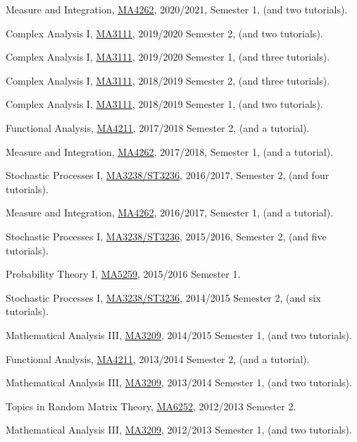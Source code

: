 \documentclass[12pt,a4paper]{article}
\newenvironment{item_list}{
 \begin{list}{}{
   \setlength{\leftmargin}{1.5em}
   \setlength{\itemsep}{0.25em}
   \setlength{\parskip}{0pt}
   \setlength{\parsep}{0.25em}
 }
}{
 \end{list}
}
\begin{document}
\begin{item_list}
\item
  Measure and Integration, \href{https://wangd-math.github.io/teaching/MA4262_F20/index.html}{MA4262}, 2020/2021, Semester 1, (and two tutorials).
\item
  Complex Analysis I, \href{https://wangd-math.github.io/teaching/MA3111_S20/index.html}{MA3111}, 2019/2020 Semester 2, (and two tutorials).
\item
  Complex Analysis I, \href{https://wangd-math.github.io/teaching/MA3111_F19/index.html}{MA3111}, 2019/2020 Semester 1, (and three tutorials).
\item
  Complex Analysis I, \href{https://wangd-math.github.io/teaching/MA3111_S19/index.html}{MA3111}, 2018/2019 Semester 2, (and three tutorials).
\item
  Complex Analysis I, \href{https://wangd-math.github.io/teaching/MA3111_F18/index.html}{MA3111}, 2018/2019 Semester 1, (and two tutorials).
\item
  Functional Analysis, \href{https://wangd-math.github.io/teaching/MA4211_S18/index.html}{MA4211}, 2017/2018 Semester 2, (and a tutorial).
\item
  Measure and Integration, \href{https://wangd-math.github.io/teaching/MA4262_F17/index.html}{MA4262}, 2017/2018, Semester 1, (and a tutorial).
\item
  Stochastic Processes I, \href{https://wangd-math.github.io/teaching/MA3238_ST3236_S17/index.html}{MA3238/ST3236}, 2016/2017, Semester 2, (and four tutorials).
\item
  Measure and Integration, \href{https://wangd-math.github.io/teaching/MA4262_F16/index.html}{MA4262}, 2016/2017, Semester 1, (and a tutorial).
\item
  Stochastic Processes I, \href{https://wangd-math.github.io/teaching/MA3238_ST3236_S16/index.html}{MA3238/ST3236}, 2015/2016, Semester 2, (and five tutorials).
\item
  Probability Theory I, \href{https://wangd-math.github.io/teaching/MA5259_F15/index.html}{MA5259}, 2015/2016 Semester 1.
\item
  Stochastic Processes I, \href{https://wangd-math.github.io/teaching/MA3238_ST3236_S15/index.html}{MA3238/ST3236}, 2014/2015 Semester 2, (and six tutorials).
\item
  Mathematical Analysis III, \href{https://wangd-math.github.io/teaching/MA3209_F14/index.html}{MA3209}, 2014/2015 Semester 1, (and two tutorials).
\item
  Functional Analysis, \href{https://wangd-math.github.io/teaching/MA4211_S14/index.html}{MA4211}, 2013/2014 Semester 2, (and a tutorial).
\item
  Mathematical Analysis III, \href{https://wangd-math.github.io/teaching/MA3209_F13/index.html}{MA3209}, 2013/2014 Semester 1, (and two tutorials).
\item
  Topics in Random Matrix Theory, \href{https://wangd-math.github.io/teaching/MA6252_S13/index.html}{MA6252}, 2012/2013 Semester 2.
\item
  Mathematical Analysis III, \href{https://wangd-math.github.io/teaching/MA3209_F12/index.html}{MA3209}, 2012/2013 Semester 1, (and two tutorials).
\end{item_list}
\end{document}
